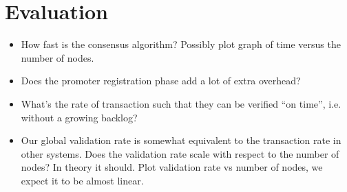 \section{Evaluation}
\begin{itemize}
  \item How fast is the consensus algorithm? Possibly plot graph of time versus
    the number of nodes.
  \item Does the promoter registration phase add a lot of extra overhead?
  \item What's the rate of transaction such that they can be verified ``on
    time'', i.e. without a growing backlog?
  \item Our global validation rate is somewhat equivalent to the transaction
    rate in other systems. Does the validation rate scale with respect to the
    number of nodes? In theory it should. Plot validation rate vs number of
    nodes, we expect it to be almost linear.
\end{itemize}